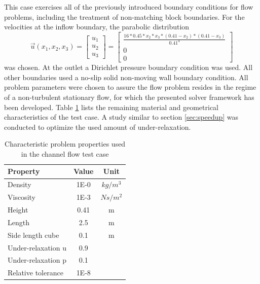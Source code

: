 This case exercises all of the previously introduced boundary conditions for flow problems, including the treatment of non-matching block boundaries. For the velocities at the inflow boundary, the parabolic distribution
\begin{displaymath}
  \vec{u}(x_1,x_2,x_3) 
  =
\left[
  \begin{array}{ccc}
    u_1 \\
    u_2 \\
    u_3 
  \end{array}
\right]
  =
\left[
  \begin{array}{ccc}
    \frac{ 16 * 0.45 * x_2 * x_3 * \left( 0.41 - x_2 \right) * \left( 0.41 - x_3 \right)}{0.41^4}
    \\[0.9em]
    0 \\[0.3em]
    0 
  \end{array}
\right]
\end{displaymath}
was chosen. At the outlet a Dirichlet pressure boundary condition was used. All other boundaries used a no-slip solid non-moving wall boundary condition. All problem parameters were chosen to assure the flow problem resides in the regime of a non-turbulent stationary flow, for which the presented solver framework has been developed. Table \ref{tab:channel} lists the remaining material and geometrical characteristics of the test case. A study similar to section \ref{sec:speedup} was conducted to optimize the used amount of under-relaxation.

\begin{table}[h!]\centering
  \caption{Characteristic problem properties used in the channel flow test case}
  \begin{tabular}{lcc}\toprule
    Property & Value & Unit \\
    \midrule
    \rowcolor{black!20} Density            & 1E-0 & $kg/m^3$  \\
    \rowcolor{black!00} Viscosity          & 1E-3 & $Ns/m^2$  \\
    \rowcolor{black!20} Height             & 0.41 & m         \\
    \rowcolor{black!00} Length             & 2.5  & m         \\
    \rowcolor{black!20} Side length cube   & 0.1  & m   \\
    \rowcolor{black!00} Under-relaxation u & 0.9  &    \\
    \rowcolor{black!20} Under-relaxation p & 0.1  &    \\
    \rowcolor{black!00} Relative tolerance & 1E-8      &
  \end{tabular}
  \label{tab:channel}
\end{table}

